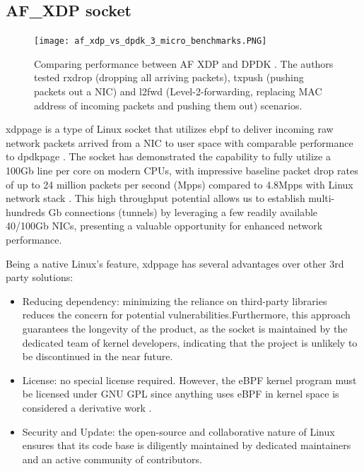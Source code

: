\subsection{AF\_XDP socket}

\begin{figure}[H]
	\centering
	\texttt{[image: af\_xdp\_vs\_dpdk\_3\_micro\_benchmarks.PNG]}
	\caption{Comparing performance between AF XDP and DPDK \cite{karlsson_path_to_dpdk_speednodate}. The authors tested  rxdrop (dropping all arriving packets), txpush (pushing packets out a NIC) and l2fwd (Level-2-forwarding, replacing MAC address of incoming packets and pushing them out) scenarios.}\label{fig:approach_design:af_xdp_vs_dpdk_3_micro_benchmarks}
\end{figure}

\ac{xdppage} is a type of Linux socket that utilizes \ac{ebpf} to deliver incoming raw network packets arrived from a \ac{NIC} to user space with comparable performance to \ac{dpdkpage} \cite{karlsson_path_to_dpdk_speednodate}. 
The socket has demonstrated the capability to fully utilize a 100Gb line per core on modern CPUs, with impressive baseline packet drop rates of up to 24 million packets per second (Mpps) compared to 4.8Mpps with Linux network stack \cite{hoiland_jorgensen_express_2018} \cite{intel_dpdk_perf}.
This high throughput potential allows us to establish multi-hundreds Gb connections (tunnels) by leveraging a few readily available 40/100Gb NICs, presenting a valuable opportunity for enhanced network performance.

Being a native Linux's feature, \ac{xdppage} has several advantages over other 3rd party solutions:
\begin{itemize}
	\item Reducing dependency: minimizing the reliance on third-party libraries reduces the concern for potential vulnerabilities.Furthermore, this approach guarantees the longevity of the product, as the socket is maintained by the dedicated team of kernel developers, indicating that the project is unlikely to be discontinued in the near future. 
	\item License: no special license required. However, the eBPF kernel program must be licensed under GNU \ac{GPL} since anything uses eBPF in kernel space is considered a derivative work \cite{gpl_email_discussion} \cite{linux_license_rule} \cite{lwn_clarify_bpf_license}.
	\item Security and Update: the open-source and collaborative nature of Linux ensures that its code base is diligently maintained by dedicated maintainers and an active community of contributors.
\end{itemize}

